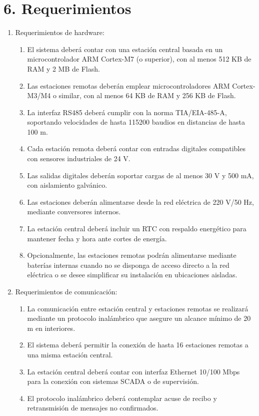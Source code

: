 \documentclass[
11pt, %
]{charter}
\begin{document}
\section{6. Requerimientos}
\label{sec:requerimientos}

\begin{enumerate}
	\item Requerimientos de hardware:
		\begin{enumerate}
			\item El sistema deberá contar con una estación central basada en un microcontrolador ARM Cortex-M7 (o superior), con al menos 512 KB de RAM y 2 MB de Flash.
			\item Las estaciones remotas deberán emplear microcontroladores ARM Cortex-M3/M4 o similar, con al menos 64 KB de RAM y 256 KB de Flash.
			\item La interfaz RS485 deberá cumplir con la norma TIA/EIA-485-A, soportando velocidades de hasta 115200 baudios en distancias de hasta 100 m.
			\item Cada estación remota deberá contar con entradas digitales compatibles con sensores industriales de 24 V.
			\item Las salidas digitales deberán soportar cargas de al menos 30 V y 500 mA, con aislamiento galvánico.
			\item Las estaciones deberán alimentarse desde la red eléctrica de 220 V/50 Hz, mediante conversores internos.
			\item La estación central deberá incluir un RTC con respaldo energético para mantener fecha y hora ante cortes de energía.
			\item Opcionalmente, las estaciones remotas podrán alimentarse mediante baterías internas cuando no se disponga de acceso directo a la red eléctrica o se desee simplificar su instalación en ubicaciones aisladas.
		\end{enumerate}
		
	\item Requerimientos de comunicación:
		\begin{enumerate}
			\item La comunicación entre estación central y estaciones remotas se realizará mediante un protocolo inalámbrico que asegure un alcance mínimo de 20 m en interiores.
			\item El sistema deberá permitir la conexión de hasta 16 estaciones remotas a una misma estación central.
			\item La estación central deberá contar con interfaz Ethernet 10/100 Mbps para la conexión con sistemas SCADA o de supervisión.
			\item El protocolo inalámbrico deberá contemplar acuse de recibo y retransmisión de mensajes no confirmados.
		\end{enumerate}
		

\end{enumerate}
\end{document}
